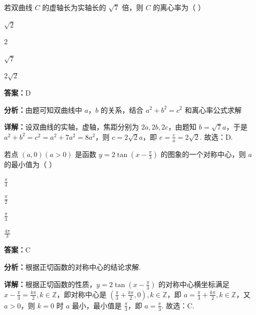 \begin{question}[points=5]
若双曲线 $C$ 的虚轴长为实轴长的 $\sqrt{7}$ 倍，则 $C$ 的离心率为（ ）
\begin{choices}
  \item $\sqrt{2}$
  \item $2$
  \item $\sqrt{7}$
  \item $2\sqrt{2}$
\end{choices}
\begin{solution}
\textbf{答案：}D

\textbf{分析：}由题可知双曲线中 $a$，$b$ 的关系，结合 $a^2+b^2=c^2$ 和离心率公式求解

\textbf{详解：}设双曲线的实轴，虚轴，焦距分别为 $2a, 2b, 2c$，由题知 $b = \sqrt{7}a$，于是 $a^2 + b^2 = c^2 = a^2 + 7a^2 = 8a^2$，则 $c = 2\sqrt{2}a$，即 $e = \frac{c}{a} = 2\sqrt{2}$. 故选：D.
\end{solution}
\end{question}

\begin{question}[points=5]
若点 $(a,0)(a>0)$ 是函数 $y = 2\tan\left(x - \frac{\pi}{3}\right)$ 的图象的一个对称中心，则 $a$ 的最小值为（ ）
\begin{choices}
  \item $\frac{\pi}{4}$
  \item $\frac{\pi}{2}$
  \item $\frac{\pi}{3}$
  \item $\frac{4\pi}{3}$
\end{choices}
\begin{solution}
\textbf{答案：}C

\textbf{分析：}根据正切函数的对称中心的结论求解.

\textbf{详解：}根据正切函数的性质，$y = 2\tan\left(x - \frac{\pi}{3}\right)$ 的对称中心横坐标满足 $x - \frac{\pi}{3} = \frac{k\pi}{2}, k \in \mathbb{Z}$，即对称中心是 $\left(\frac{\pi}{3} + \frac{k\pi}{2}, 0\right), k \in \mathbb{Z}$，即 $a = \frac{\pi}{3} + \frac{k\pi}{2}, k \in \mathbb{Z}$，又 $a>0$，则 $k=0$ 时 $a$ 最小，最小值是 $\frac{\pi}{3}$，即 $a = \frac{\pi}{3}$. 故选：C.
\end{solution}
\end{question}

